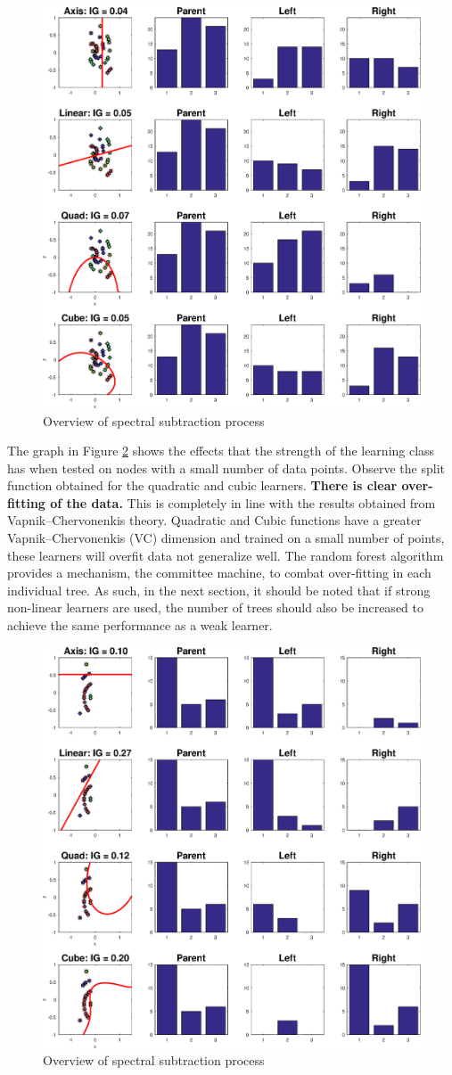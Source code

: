 \documentclass[a4paper,pra,twocolumn,10pt,aps,longbibliography,nobalancelastpage]{revtex4-1}
\begin{document}
\begin{figure}[H]
	\centering
    \includegraphics[width=0.60\columnwidth]{split_function_visualitions_1}
    \caption{Overview of spectral subtraction process}
    \label{fig:learners_1}
\end{figure}

The graph in Figure \ref{fig:learners_2} shows the effects that the strength of the learning class has when tested on nodes with a small number of data points. Observe the split function obtained for the quadratic and cubic learners. \textbf{There is clear over-fitting of the data.} This is completely in line with the results obtained from Vapnik–Chervonenkis theory. Quadratic and Cubic functions have a greater Vapnik–Chervonenkis (VC) dimension and trained on a small number of points, these learners will overfit data not generalize well. The random forest algorithm provides a mechanism, the committee machine, to combat over-fitting in each individual tree. As such, in the next section, it should be noted that if strong non-linear learners are used, the number of trees should also be increased to achieve the same performance as a weak learner. 

\begin{figure}[H]
	\centering
    \includegraphics[width=0.60\columnwidth]{split_function_visualitions_3}
    \caption{Overview of spectral subtraction process}
    \label{fig:learners_2}
\end{figure}
\end{document}
